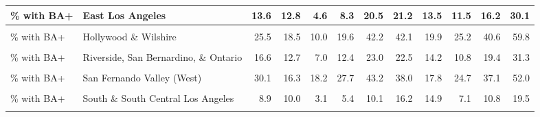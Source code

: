 \begin{table}[!h]
\begin{tabular}[t]{l|>{}l||r|r|r|r|r|r|r|r|r|r}
\hline
\% with BA+ & East Los Angeles & 13.6 & 12.8 & 4.6 & 8.3 & 20.5 & 21.2 & 13.5 & 11.5 & 16.2 & 30.1\\
\hline
\cellcolor{gray!6}{\% with BA+} & \cellcolor{gray!6}{Glendale and Pasadena} & \cellcolor{gray!6}{29.4} & \cellcolor{gray!6}{17.6} & \cellcolor{gray!6}{16.2} & \cellcolor{gray!6}{27.5} & \cellcolor{gray!6}{40.5} & \cellcolor{gray!6}{39.1} & \cellcolor{gray!6}{19.3} & \cellcolor{gray!6}{24.2} & \cellcolor{gray!6}{39.2} & \cellcolor{gray!6}{53.7}\\
\hline
\% with BA+ & Hollywood \& Wilshire & 25.5 & 18.5 & 10.0 & 19.6 & 42.2 & 42.1 & 19.9 & 25.2 & 40.6 & 59.8\\
\hline
\cellcolor{gray!6}{\% with BA+} & \cellcolor{gray!6}{Long Beach} & \cellcolor{gray!6}{20.9} & \cellcolor{gray!6}{16.2} & \cellcolor{gray!6}{7.1} & \cellcolor{gray!6}{16.9} & \cellcolor{gray!6}{31.7} & \cellcolor{gray!6}{28.4} & \cellcolor{gray!6}{17.1} & \cellcolor{gray!6}{13.6} & \cellcolor{gray!6}{25.9} & \cellcolor{gray!6}{40.8}\\
\hline
\% with BA+ & Riverside, San Bernardino, \& Ontario & 16.6 & 12.7 & 7.0 & 12.4 & 23.0 & 22.5 & 14.2 & 10.8 & 19.4 & 31.3\\
\hline
\cellcolor{gray!6}{\% with BA+} & \cellcolor{gray!6}{San Fernando Valley (East)} & \cellcolor{gray!6}{28.2} & \cellcolor{gray!6}{18.6} & \cellcolor{gray!6}{13.7} & \cellcolor{gray!6}{23.3} & \cellcolor{gray!6}{40.3} & \cellcolor{gray!6}{39.3} & \cellcolor{gray!6}{21.4} & \cellcolor{gray!6}{21.3} & \cellcolor{gray!6}{34.4} & \cellcolor{gray!6}{59.1}\\
\hline
\% with BA+ & San Fernando Valley (West) & 30.1 & 16.3 & 18.2 & 27.7 & 43.2 & 38.0 & 17.8 & 24.7 & 37.1 & 52.0\\
\hline
\cellcolor{gray!6}{\% with BA+} & \cellcolor{gray!6}{Santa Ana} & \cellcolor{gray!6}{30.6} & \cellcolor{gray!6}{19.4} & \cellcolor{gray!6}{12.9} & \cellcolor{gray!6}{31.2} & \cellcolor{gray!6}{46.1} & \cellcolor{gray!6}{40.6} & \cellcolor{gray!6}{20.4} & \cellcolor{gray!6}{23.8} & \cellcolor{gray!6}{40.8} & \cellcolor{gray!6}{56.3}\\
\hline
\% with BA+ & South \& South Central Los Angeles & 8.9 & 10.0 & 3.1 & 5.4 & 10.1 & 16.2 & 14.9 & 7.1 & 10.8 & 19.5\\
\hline
\cellcolor{gray!6}{\% with BA+} & \cellcolor{gray!6}{South Bay} & \cellcolor{gray!6}{31.7} & \cellcolor{gray!6}{20.8} & \cellcolor{gray!6}{13.7} & \cellcolor{gray!6}{25.8} & \cellcolor{gray!6}{46.9} & \cellcolor{gray!6}{41.5} & \cellcolor{gray!6}{21.8} & \cellcolor{gray!6}{22.6} & \cellcolor{gray!6}{36.7} & \cellcolor{gray!6}{58.8}\\

\end{tabular}
\end{table}

